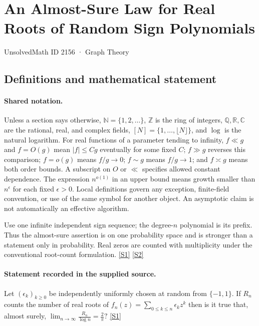 \documentclass[11pt,a4paper]{article}
\newcommand{\N}{\mathbb{N}}
\newcommand{\Z}{\mathbb{Z}}
\newcommand{\Q}{\mathbb{Q}}
\newcommand{\R}{\mathbb{R}}
\newcommand{\C}{\mathbb{C}}
\newcommand{\sref}[2]{\hyperlink{source:#1:#2}{[S#2]}}
\begin{document}

\setcounter{section}{2155}

\section{An Almost-Sure Law for Real Roots of Random Sign Polynomials}\label{2156}

{\small\sffamily UnsolvedMath ID 2156 · Graph Theory}

\subsection{Definitions and mathematical statement}

\paragraph{Shared notation.}Unless a section says otherwise, $\N=\{1,2,\ldots\}$,
$\Z$ is the ring of integers, $\Q,\R,\C$ are the rational, real, and complex
fields, $[N]=\{1,\ldots,\lfloor N\rfloor\}$, and $\log$ is the natural
logarithm. For real functions of a parameter tending to infinity,
$f\ll g$ and $f=O(g)$ mean $|f|\leq Cg$ eventually for some fixed $C$;
$f\gg g$ reverses this comparison; $f=o(g)$ means $f/g\to0$;
$f\sim g$ means $f/g\to1$; and $f\asymp g$ means both order bounds.
A subscript on $O$ or $\ll$ specifies allowed constant dependence.
The expression $n^{o(1)}$ in an upper bound means growth smaller than
$n^\epsilon$ for each fixed $\epsilon>0$. Local definitions govern any
exception, finite-field convention, or use of the same symbol for another
object. An asymptotic claim is not automatically an effective algorithm.



Use one infinite independent sign sequence; the degree-$n$ polynomial is its prefix. Thus the almost-sure assertion is on one probability space and is stronger than a statement only in probability. Real zeros are counted with multiplicity under the conventional root-count formulation. \sref{2156}{1} \sref{2156}{2}

\paragraph{Statement recorded in the supplied source.}
Let $(\epsilon_k)_{k\geq 0}$ be independently uniformly chosen at random from $\{-1,1\}$. If $R_n$ counts the number of real roots of $f_n(z)=\sum_{0\leq k\leq n}\epsilon_k z^k$ then is it true that, almost surely, $ \lim_{n\to \infty}\frac{R_n}{\log n}=\frac{2}{\pi}? $ \sref{2156}{1}
\end{document}
